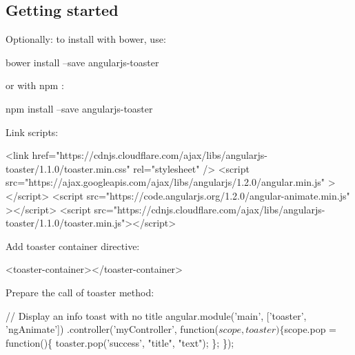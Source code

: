 \subsection*{Getting started}

Optionally\+: to install with bower, use\+: 
\begin{DoxyCode}
bower install --save angularjs-toaster
\end{DoxyCode}
 or with npm \+: 
\begin{DoxyCode}
npm install --save angularjs-toaster
\end{DoxyCode}

\begin{DoxyItemize}
\item Link scripts\+:
\end{DoxyItemize}


\begin{DoxyCode}
<link href="https://cdnjs.cloudflare.com/ajax/libs/angularjs-toaster/1.1.0/toaster.min.css"
       rel="stylesheet" />
<script src="https://ajax.googleapis.com/ajax/libs/angularjs/1.2.0/angular.min.js" ></script>
<script src="https://code.angularjs.org/1.2.0/angular-animate.min.js" ></script>
<script src="https://cdnjs.cloudflare.com/ajax/libs/angularjs-toaster/1.1.0/toaster.min.js"></script>
\end{DoxyCode}



\begin{DoxyItemize}
\item Add toaster container directive\+:
\end{DoxyItemize}


\begin{DoxyCode}
<toaster-container></toaster-container>
\end{DoxyCode}



\begin{DoxyItemize}
\item Prepare the call of toaster method\+:
\end{DoxyItemize}


\begin{DoxyCode}
// Display an info toast with no title
angular.module('main', ['toaster', 'ngAnimate'])
    .controller('myController', function($scope, toaster) \{
        $scope.pop = function()\{
            toaster.pop('success', "title", "text");
        \};
    \});
\end{DoxyCode}



